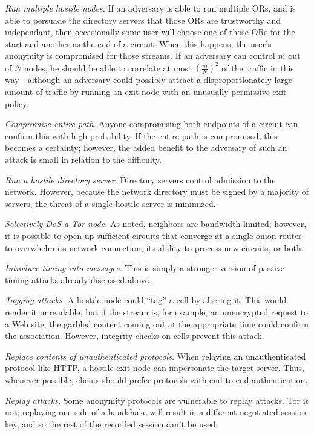 \documentclass[times,10pt,twocolumn]{article}
\begin{document}
\emph{Run multiple hostile nodes.}  If an adversary is able to
run multiple ORs, and is able to persuade the directory servers
that those ORs are trustworthy and independant, then occasionally
some user will choose one of those ORs for the start and another
as the end of a circuit.  When this happens, the user's
anonymity is compromised for those streams.  If an adversary can
control $m$ out of $N$ nodes, he should be able to correlate at most 
$\left(\frac{m}{N}\right)^2$ of the traffic in this way---although an 
adversary
could possibly attract a disproportionately large amount of traffic
by running an exit node with an unusually permissive exit policy.

\emph{Compromise entire path.} Anyone compromising both
endpoints of a circuit can confirm this with high probability. If
the entire path is compromised, this becomes a certainty; however,
the added benefit to the adversary of such an attack is small in
relation to the difficulty.

\emph{Run a hostile directory server.} Directory servers control
admission to the network. However, because the network directory
must be signed by a majority of servers, the threat of a single
hostile server is minimized.
  
\emph{Selectively DoS a Tor node.} As noted, neighbors are
bandwidth limited; however, it is possible to open up sufficient
circuits that converge at a single onion router to
overwhelm its network connection, its ability to process new
circuits, or both.

\emph{Introduce timing into messages.} This is simply a stronger
version of passive timing attacks already discussed above.
  
\emph{Tagging attacks.} A hostile node could ``tag'' a
cell by altering it. This would render it unreadable, but if the
stream is, for example, an unencrypted request to a Web site,
the garbled content coming out at the appropriate time could confirm
the association. However, integrity checks on cells prevent
this attack.

\emph{Replace contents of unauthenticated protocols.}  When
relaying an unauthenticated protocol like HTTP, a hostile exit node 
can impersonate the target server.  Thus, whenever possible, clients
should prefer protocols with end-to-end authentication.

\emph{Replay attacks.} Some anonymity protocols are vulnerable
to replay attacks.  Tor is not; replaying one side of a handshake
will result in a different negotiated session key, and so the rest
of the recorded session can't be used.  
\end{document}
